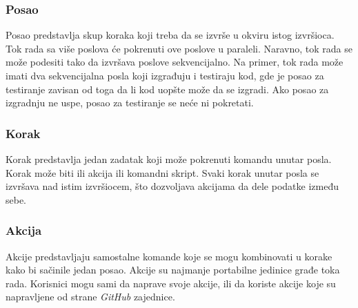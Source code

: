 \subsubsection{Posao}
Posao predstavlja skup koraka koji treba da se izvrše u okviru istog izvršioca. Tok rada sa više poslova 
će pokrenuti ove poslove u paraleli. Naravno, tok rada se može podesiti tako da izvršava poslove 
sekvencijalno. Na primer, tok rada može imati dva sekvencijalna posla koji izgrađuju i testiraju kod, 
gde je posao za testiranje zavisan od toga da li kod uopšte može da se izgradi. Ako posao za izgradnju 
ne uspe, posao za testiranje se neće ni pokretati.

\subsubsection{Korak}
Korak predstavlja jedan zadatak koji može pokrenuti komandu unutar posla. Korak može biti ili akcija ili 
komandni skript. Svaki korak unutar posla se izvršava nad istim izvršiocem, što dozvoljava akcijama da 
dele podatke između sebe.

\subsubsection{Akcija}
Akcije predstavljaju samostalne komande koje se mogu kombinovati u korake kako bi sačinile jedan posao.
Akcije su najmanje portabilne jedinice građe toka rada. Korisnici mogu sami da naprave svoje akcije,
ili da koriste akcije koje su napravljene od strane \textit{GitHub} zajednice. 
